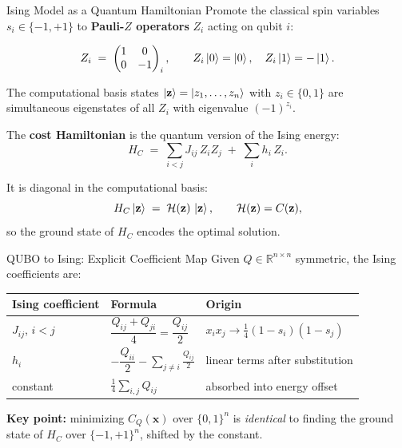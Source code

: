 \documentclass{beamer}
\begin{document}
\begin{frame}{Ising Model as a Quantum Hamiltonian}
Promote the classical spin variables $s_i\in\{-1,+1\}$ to
\textbf{Pauli-$Z$ operators} $Z_i$ acting on qubit $i$:

\[
Z_i \;=\; \begin{pmatrix}1&0\\0&-1\end{pmatrix}_i,\qquad
Z_i\ket{0} = \ket{0},\quad Z_i\ket{1}=-\ket{1}.
\]

The computational basis states $\ket{\mathbf{z}} =
\ket{z_1,\dots,z_n}$ with $z_i\in\{0,1\}$ are simultaneous
eigenstates of all $Z_i$ with eigenvalue $(-1)^{z_i}$.

\medskip

The \textbf{cost Hamiltonian} is the quantum version of the Ising energy:
\[
\boxed{
H_C \;=\; \sum_{i<j} J_{ij}\,Z_i Z_j \;+\; \sum_i h_i\,Z_i.}
\]

It is diagonal in the computational basis:
\[
H_C\ket{\mathbf{z}} \;=\; \mathcal{H}(\mathbf{z})\,\ket{\mathbf{z}},
\qquad \mathcal{H}(\mathbf{z}) = C(\mathbf{z}),
\]
so the ground state of $H_C$ encodes the optimal solution.
\end{frame}


\begin{frame}{QUBO to Ising: Explicit Coefficient Map}
Given $Q\in\mathbb{R}^{n\times n}$ symmetric, the Ising coefficients are:

\medskip

\begin{center}
\begin{tabular}{lll}
\hline
\textbf{Ising coefficient} & \textbf{Formula} & \textbf{Origin} \\
\hline
$J_{ij}$, $i<j$ &
$\dfrac{Q_{ij}+Q_{ji}}{4} = \dfrac{Q_{ij}}{2}$ &
$x_ix_j \to \tfrac{1}{4}(1-s_i)(1-s_j)$\\[8pt]
$h_i$ &
$-\dfrac{Q_{ii}}{2} - \displaystyle\sum_{j\neq i}\frac{Q_{ij}}{2}$ &
linear terms after substitution \\[8pt]
constant & $\displaystyle\frac{1}{4}\sum_{i,j}Q_{ij}$ & absorbed into energy offset \\
\hline
\end{tabular}
\end{center}

\medskip

\textbf{Key point:} minimizing $C_Q(\mathbf{x})$ over
$\{0,1\}^n$ is \emph{identical} to finding the ground state of $H_C$
over $\{-1,+1\}^n$, shifted by the constant.
\end{frame}
\end{document}

